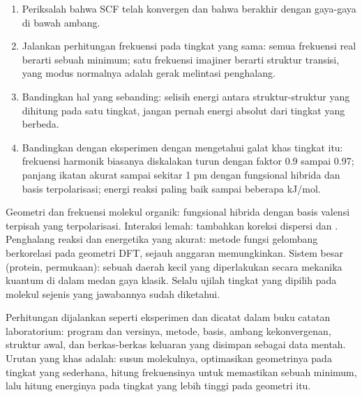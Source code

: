 \begin{method}\label{met:b3:computational-chemistry:read-calculation}
\begin{enumerate}
  \item Periksalah bahwa SCF telah konvergen dan bahwa 
        berakhir dengan gaya-gaya di bawah ambang.
  \item Jalankan perhitungan frekuensi pada tingkat yang sama: semua
        frekuensi real berarti sebuah minimum; satu frekuensi imajiner berarti
        struktur transisi, yang modus normalnya adalah gerak melintasi
        penghalang.
  \item Bandingkan hal yang sebanding: selisih energi antara
        struktur-struktur yang dihitung pada satu tingkat, jangan pernah
        energi absolut dari tingkat yang berbeda.
  \item Bandingkan dengan eksperimen dengan mengetahui galat khas tingkat
        itu: frekuensi harmonik biasanya diskalakan turun dengan faktor 0.9
        sampai 0.97; panjang ikatan akurat sampai sekitar 1 pm dengan
        fungsional hibrida dan basis terpolarisasi; energi reaksi paling baik
        sampai beberapa \unit{kJ/mol}.
\end{enumerate}
\end{method}

\begin{method}\label{met:b3:computational-chemistry:choose-level}
Geometri dan frekuensi molekul organik: fungsional hibrida dengan basis
valensi terpisah yang terpolarisasi. Interaksi lemah: tambahkan koreksi
dispersi dan . Penghalang reaksi dan energetika yang akurat:
metode fungsi gelombang berkorelasi pada geometri DFT, sejauh anggaran
memungkinkan. Sistem besar (protein, permukaan): sebuah daerah kecil yang
diperlakukan secara mekanika kuantum di dalam medan gaya klasik. Selalu
ujilah tingkat yang dipilih pada molekul sejenis yang jawabannya sudah
diketahui.
\end{method}

\begin{inthelab}
Perhitungan dijalankan seperti eksperimen dan dicatat dalam buku catatan
laboratorium: program dan versinya, metode, basis, ambang kekonvergenan,
struktur awal, dan berkas-berkas keluaran yang disimpan sebagai data mentah.
Urutan yang khas adalah: susun molekulnya, optimasikan geometrinya pada
tingkat yang sederhana, hitung frekuensinya untuk memastikan sebuah minimum,
lalu hitung energinya pada tingkat yang lebih tinggi pada geometri itu.
\end{inthelab}

